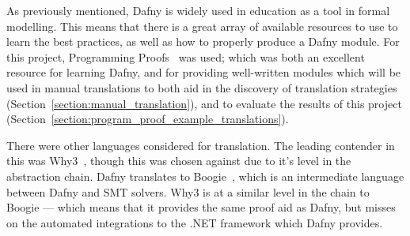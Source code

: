 \documentclass{entcs}
\newcommand{\lfcomment}[1]{\ifthenelse { \boolean{showComments} } {\textcolor{red}{LF:~#1}} { } } %
\begin{document}
As previously mentioned, Dafny is widely used in education as a tool in formal modelling. This means that there is a great array of available resources to use to learn the best practices, as well as how to properly produce a Dafny module. For this project, Programming Proofs~\cite{ProgramProofs} was used; which was both an excellent resource for learning Dafny, and for providing well-written modules which will be used in manual translations to both aid in the discovery of translation strategies (Section~\ref{section:manual_translation}), and to evaluate the results of this project (Section~\ref{section:program_proof_example_translations}).

There were other languages considered for translation. The leading contender in this was Why3~\cite{Fillitre2013Why3W}, though this was chosen against due to it's level in the abstraction chain. Dafny translates to Boogie~\cite{Boogie}, which is an intermediate language between Dafny and SMT solvers. Why3 is at a similar level in the chain to Boogie --- which means that it provides the same proof aid as Dafny, but misses on the automated integrations to the .NET framework which Dafny provides.


% 



\end{document}
